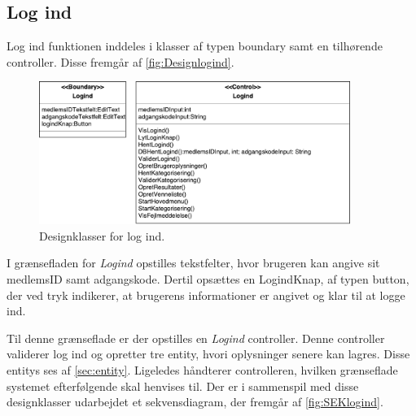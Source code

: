 \subsection*{Log ind}
Log ind funktionen inddeles i klasser af typen boundary samt en tilhørende controller. Disse fremgår af \autoref{fig:Designlogind}. 

\begin{figure} [H]
\centering
\includegraphics[width=0.9\textwidth]{figures/MVC/MVCLogInd}
\caption{Designklasser for log ind.}
\label{fig:Designlogind}
\end{figure}

\noindent
I grænsefladen for \textit{Logind} opstilles tekstfelter, hvor brugeren kan angive sit medlemsID samt adgangskode. Dertil opsættes en LogindKnap, af typen button, der ved tryk indikerer, at brugerens informationer er angivet og klar til at logge ind. 

Til denne grænseflade er der opstilles en \textit{Logind} controller. Denne controller validerer log ind og opretter tre entity, hvori oplysninger senere kan lagres. Disse entitys ses af \autoref{sec:entity}. Ligeledes håndterer controlleren, hvilken grænseflade systemet efterfølgende skal henvises til. Der er i sammenspil med disse designklasser udarbejdet et sekvensdiagram, der fremgår af \autoref{fig:SEKlogind}.

